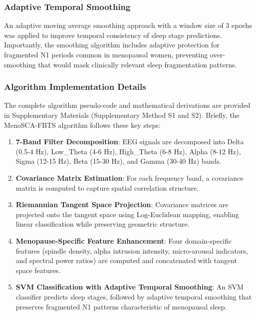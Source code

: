 \documentclass[a4paper,fleqn]{cas-dc}
\begin{document}
\subsubsection{Adaptive Temporal Smoothing}
An adaptive moving average smoothing approach with a window size of 3 epochs was applied to improve temporal consistency of sleep stage predictions. Importantly, the smoothing algorithm includes adaptive protection for fragmented N1 periods common in menopausal women, preventing over-smoothing that would mask clinically relevant sleep fragmentation patterns.

\subsubsection{Algorithm Implementation Details}

The complete algorithm pseudo-code and mathematical derivations are provided in Supplementary Materials (Supplementary Method S1 and S2). Briefly, the MenoSCA-FBTS algorithm follows these key steps:

\begin{enumerate}
\item \textbf{7-Band Filter Decomposition}: EEG signals are decomposed into Delta (0.5-4 Hz), Low\_Theta (4-6 Hz), High\_Theta (6-8 Hz), Alpha (8-12 Hz), Sigma (12-15 Hz), Beta (15-30 Hz), and Gamma (30-40 Hz) bands.

\item \textbf{Covariance Matrix Estimation}: For each frequency band, a covariance matrix is computed to capture spatial correlation structure.

\item \textbf{Riemannian Tangent Space Projection}: Covariance matrices are projected onto the tangent space using Log-Euclidean mapping, enabling linear classification while preserving geometric structure.

\item \textbf{Menopause-Specific Feature Enhancement}: Four domain-specific features (spindle density, alpha intrusion intensity, micro-arousal indicators, and spectral power ratios) are computed and concatenated with tangent space features.

\item \textbf{SVM Classification with Adaptive Temporal Smoothing}: An SVM classifier predicts sleep stages, followed by adaptive temporal smoothing that preserves fragmented N1 patterns characteristic of menopausal sleep.
\end{enumerate}
\end{document}

